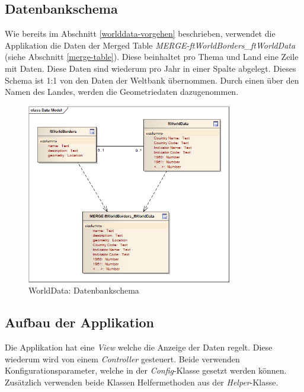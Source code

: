 \subsection{Datenbankschema}
Wie bereits im Abschnitt \ref{worlddata-vorgehen} beschrieben, verwendet die Applikation die Daten der Merged Table \emph{MERGE-ftWorldBorders\_ftWorldData} (siehe Abschnitt \ref{merge-table}). Diese beinhaltet pro Thema und Land eine Zeile mit Daten. Diese Daten sind wiederum pro Jahr in einer Spalte abgelegt. Dieses Schema ist 1:1 von den Daten der Weltbank übernommen. Durch einen  über den Namen des Landes, werden die Geometriedaten dazugenommen.

\begin{figure}[H]
	\centering
	\includegraphics[width=0.8\textwidth]{images/usecase1-worlddata/uml/worlddata-datamodel}
	\caption{WorldData: Datenbankschema}
	\label{worlddata-datamodel}
\end{figure}

\subsection{Aufbau der Applikation}
Die Applikation hat eine \emph{View} welche die Anzeige der Daten regelt. Diese wiederum wird von einem \emph{Controller} gesteuert. Beide verwenden Konfigurationsparameter, welche in der \emph{Config}-Klasse gesetzt werden können. Zusätzlich verwenden beide Klassen Helfermethoden aus der \emph{Helper}-Klasse.


